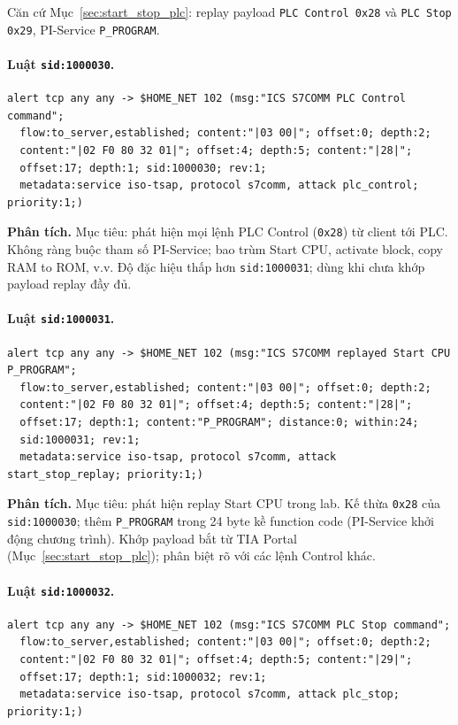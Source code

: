 \documentclass[../main.tex]{subfiles}
\begin{document}
Căn cứ Mục~\ref{sec:start_stop_plc}: replay payload \texttt{PLC Control 0x28} và \texttt{PLC Stop 0x29}, PI-Service \texttt{P\_PROGRAM}.

\paragraph{Luật \texttt{sid:1000030}.}
\begin{footnotesize}
\begin{verbatim}
alert tcp any any -> $HOME_NET 102 (msg:"ICS S7COMM PLC Control command";
  flow:to_server,established; content:"|03 00|"; offset:0; depth:2;
  content:"|02 F0 80 32 01|"; offset:4; depth:5; content:"|28|";
  offset:17; depth:1; sid:1000030; rev:1;
  metadata:service iso-tsap, protocol s7comm, attack plc_control; priority:1;)
\end{verbatim}
\end{footnotesize}

\noindent\textbf{Phân tích.}
Mục tiêu: phát hiện mọi lệnh PLC Control (\texttt{0x28}) từ client tới PLC. Không ràng buộc tham số PI-Service; bao trùm Start CPU, activate block, copy RAM to ROM, v.v. Độ đặc hiệu thấp hơn \texttt{sid:1000031}; dùng khi chưa khớp payload replay đầy đủ.

\paragraph{Luật \texttt{sid:1000031}.}
\begin{footnotesize}
\begin{verbatim}
alert tcp any any -> $HOME_NET 102 (msg:"ICS S7COMM replayed Start CPU P_PROGRAM";
  flow:to_server,established; content:"|03 00|"; offset:0; depth:2;
  content:"|02 F0 80 32 01|"; offset:4; depth:5; content:"|28|";
  offset:17; depth:1; content:"P_PROGRAM"; distance:0; within:24;
  sid:1000031; rev:1;
  metadata:service iso-tsap, protocol s7comm, attack start_stop_replay; priority:1;)
\end{verbatim}
\end{footnotesize}

\noindent\textbf{Phân tích.}
Mục tiêu: phát hiện replay Start CPU trong lab. Kế thừa \texttt{0x28} của \texttt{sid:1000030}; thêm \texttt{P\_PROGRAM} trong 24 byte kề function code (PI-Service khởi động chương trình). Khớp payload bắt từ TIA Portal (Mục~\ref{sec:start_stop_plc}); phân biệt rõ với các lệnh Control khác.

\paragraph{Luật \texttt{sid:1000032}.}
\begin{footnotesize}
\begin{verbatim}
alert tcp any any -> $HOME_NET 102 (msg:"ICS S7COMM PLC Stop command";
  flow:to_server,established; content:"|03 00|"; offset:0; depth:2;
  content:"|02 F0 80 32 01|"; offset:4; depth:5; content:"|29|";
  offset:17; depth:1; sid:1000032; rev:1;
  metadata:service iso-tsap, protocol s7comm, attack plc_stop; priority:1;)
\end{verbatim}
\end{footnotesize}
\end{document}

